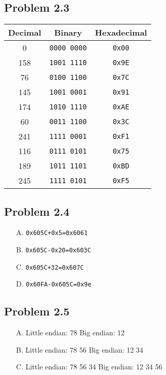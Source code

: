 \documentclass[a4paper]{article}
\begin{document}
\subsection*{Problem 2.3}
\begin{tabular}{ccc}
    Decimal &Binary      &Hexadecimal\\
    \hline
    0       &\texttt{0000 0000}   &\texttt{0x00}\\
    158     &\texttt{1001 1110}   &\texttt{0x9E}\\
    76      &\texttt{0100 1100}   &\texttt{0x7C}\\
    145     &\texttt{1001 0001}   &\texttt{0x91}\\
    174     &\texttt{1010 1110}   &\texttt{0xAE}\\
    60      &\texttt{0011 1100}   &\texttt{0x3C}\\
    241     &\texttt{1111 0001}   &\texttt{0xF1}\\
    116     &\texttt{0111 0101}   &\texttt{0x75}\\
    189     &\texttt{1011 1101}   &\texttt{0xBD}\\
    245     &\texttt{1111 0101}   &\texttt{0xF5}
\end{tabular}

\subsection*{Problem 2.4}
\begin{enumerate}
    \item [A.] \texttt{0x605C+0x5=0x6061}
    \item [B.] \texttt{0x605C-0x20=0x603C}
    \item [C.] \texttt{0x605C+32=0x607C}
    \item [D.] \texttt{0x60FA-0x605C=0x9e}
\end{enumerate}

\subsection*{Problem 2.5}
\begin{enumerate}
    \item [A.] Little endian: 78 Big endian: 12
    \item [B.] Little endian: 78 56 Big endian: 12 34
    \item [C.] Little endian: 78 56 34 Big endian: 12 34 56
\end{enumerate}
\end{document}
